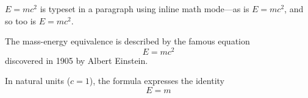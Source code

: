 \documentclass[12pt, a4paper]{article} %
\begin{document}
    \begin{math}                                           %
        E=mc^2
    \end{math} is typeset in a paragraph using inline math mode---as is $E=mc^2$, and so too is \(E=mc^2\).

    The mass-energy equivalence is described by the famous equation
    \[ E=mc^2 \] discovered in 1905 by Albert Einstein.

    In natural units ($c = 1$), the formula expresses the identity
    \begin{equation}
        E=m
    \end{equation}
\end{document}
